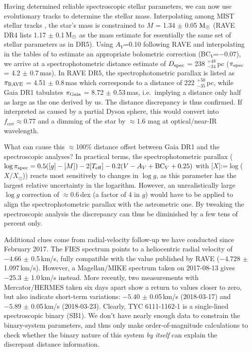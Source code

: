 \documentclass[twocolumn]{aastex6}
\begin{document}
Having determined reliable spectroscopic stellar parameters, we can now use evolutionary tracks to determine the stellar mass. Interpolating among MIST stellar tracks \citep{Choi2016}, the star's mass is constrained to $M$ = 1.34 $\pm$ 0.05 ${\rm M}_\odot$ (RAVE DR4 lists 1.17 $\pm$ 0.1\,${\rm M}_\odot$ as the mass estimate for essentially the same set of stellar parameters as in DR5). Using $A_V$=0.10 following RAVE and interpolating in the tables of \cite{Alonso1995} to estimate an appropriate bolometric correction (BC$_V$=$-0.07$), we arrive at a spectrophotometric distance estimate of $D_{\rm spec}$ = 238 $^{+48}_{-34}$\,pc ($\pi_{\rm spec}$ = 4.2 $\pm$ 0.7\,mas). In RAVE DR5, the spectrophotometric parallax is listed as $\pi_{\rm RAVE}$ = 4.51 $\pm$ 0.8\,mas which corresponds to a distance of 222 $^{+50}_{-35}$\,pc, while Gaia DR1 tabulates $\pi_{\rm Gaia}$ = 8.72 $\pm$ 0.53\,mas, i.e.\ implying a distance only half as large as the one derived by us. The distance discrepancy is thus confirmed. If interpreted as caused by a partial Dyson sphere, this would convert into $f_\mathrm{cov}\approx 0.77$ and a dimming of the star by $\approx 1.6$ mag at optical/near-IR wavelength. 

What can cause this $\approx$100\% distance offset between Gaia DR1 and the spectroscopic analyses? In practical terms, the spectrophotometric parallax ($\log \pi_{\rm spec} = 0.5([g] - [M]) - 2[{T_\mathrm{eff}}] -0.2(V - A_V + {\rm BC}_V +0.25)$ with [$X$]:=$\log$($X/X_\odot$)) reacts most sensitively to changes in $\log g$, as this parameter has the largest relative uncertainty in the logarithm. However, an unrealistically large $\log g$ correction of $\approx$0.6\,dex (a factor of 4 in $g$) would have to be applied to align the spectrophotometric parallax with the astrometric one. By tweaking the spectroscopic analysis the discrepancy can thus be diminished by a few tens of percent only. 

Additional clues come from radial-velocity follow-up we have conducted since February 2017. The FIES spectrum points to a heliocentric radial velocity of $-4.66$ $\pm$ 0.5\,km/s, fully compatible with the value published by RAVE ($-4.728$ $\pm$ 1.097\,km/s). However, a Magellan/MIKE spectrum taken on 2017-08-13 gives $-25.3$ $\pm$ 1.0\,km/s instead. More recently, two measurements with Mercator/HERMES taken six days apart show a return to values closer to zero, but also indicate short-term variations: $-5.40$ $\pm$ 0.05\,km/s (2018-03-17) and $-5.89$ $\pm$ 0.05\,km/s (2018-03-23). Clearly, TYC 6111-1162-1 is a single-lined spectroscopic binary (SB1). We don't have nearly enough data to constrain the binary-system parameters, and thus only make order-of-magnitude calculations to check whether the binary nature of this system {\em by itself\/} can explain the discrepant distance information. 
\end{document}
